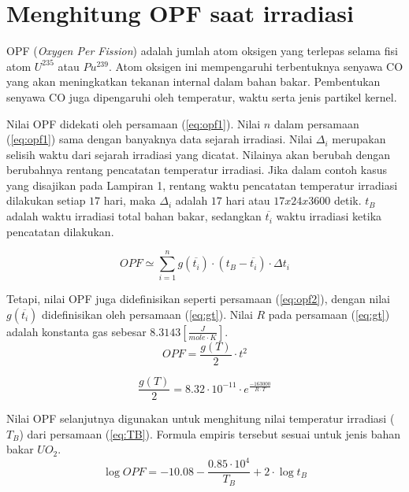 \documentclass[a4paper,11pt]{report}
\begin{document}
\section{Menghitung OPF saat irradiasi}
\label{sec:OPF}
OPF (\textit{Oxygen Per Fission}) adalah jumlah atom oksigen yang terlepas selama fisi atom $U^{235}$ atau $Pu^{239}$. Atom oksigen ini mempengaruhi terbentuknya senyawa CO yang akan meningkatkan tekanan internal dalam bahan bakar. Pembentukan senyawa CO juga dipengaruhi oleh temperatur, waktu serta jenis partikel kernel. 

Nilai OPF didekati oleh persamaan (\ref{eq:opf1}). Nilai $n$ dalam persamaan (\ref{eq:opf1}) sama dengan banyaknya data sejarah irradiasi. Nilai $\Delta_{i}$ merupakan selisih waktu dari sejarah irradiasi yang dicatat. Nilainya akan berubah dengan berubahnya rentang pencatatan temperatur irradiasi. Jika dalam contoh kasus yang disajikan pada Lampiran 1, rentang waktu pencatatan temperatur irradiasi dilakukan setiap $17$ hari, maka $\Delta_{i}$ adalah $17$ hari atau $17 x 24 x 3600$ detik. $t_B$ adalah waktu irradiasi total bahan bakar, sedangkan $\overline{t_i}$ waktu irradiasi ketika pencatatan dilakukan.

\begin{equation}
  OPF \simeq \sum_{i=1}^{n} g(\overline{t_{i}}) \cdot (t_{B}-\overline{t_{i}}) \cdot \Delta t_{i}
  \label{eq:opf1}
\end{equation}
 
Tetapi, nilai OPF juga didefinisikan seperti persamaan (\ref{eq:opf2}), dengan nilai $g(\overline{t_{i}})$ didefinisikan oleh persamaan (\ref{eq:gt}). Nilai $R$ pada persamaan (\ref{eq:gt}) adalah konstanta gas sebesar $8.3143 [\frac{J}{mole \cdot K}]$.
\begin{equation}
  OPF = \frac{g(T)}{2} \cdot t^2
  \label{eq:opf2}
\end{equation} 
 
\begin{equation}
  \frac{g(T)}{2}=8.32 \cdot 10^{-11} \cdot e^{\frac{-163000}{R \cdot T}}
  \label{eq:gt}
\end{equation} 
 
Nilai OPF selanjutnya digunakan untuk menghitung nilai temperatur irradiasi ($T_B$) dari persamaan (\ref{eq:TB}). Formula empiris tersebut sesuai untuk jenis bahan bakar $UO_2$.
\begin{equation}
  \log OPF=-10.08-\frac{0.85 \cdot 10^4}{T_B} + 2 \cdot \log t_B
  \label{eq:TB}
\end{equation} 
\end{document}
